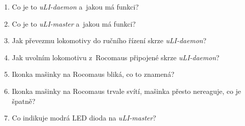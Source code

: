 \documentclass[12pt,a4paper]{article}
\begin{document}
\begin{enumerate}
	\item Co je to \textit{uLI-daemon} a~jakou má funkci?
	
	\item Co je to \textit{uLI-master} a~jakou má funkci?
	
	\item Jak převezmu lokomotivy do ručního řízení skrze \textit{uLI-daemon}?
	
	\item Jak uvolním lokomotivu z~Rocomaus připojené skrze \textit{uLI-daemon}?
	
	\item Ikonka mašinky na Rocomaus bliká, co to znamená?
	
	\item Ikonka mašinky na Rocomaus trvale svítí, mašinka přesto nereaguje, co je špatně?
	
	\item Co indikuje modrá LED dioda na \textit{uLI-master}?
	
\end{enumerate}
\end{document}
